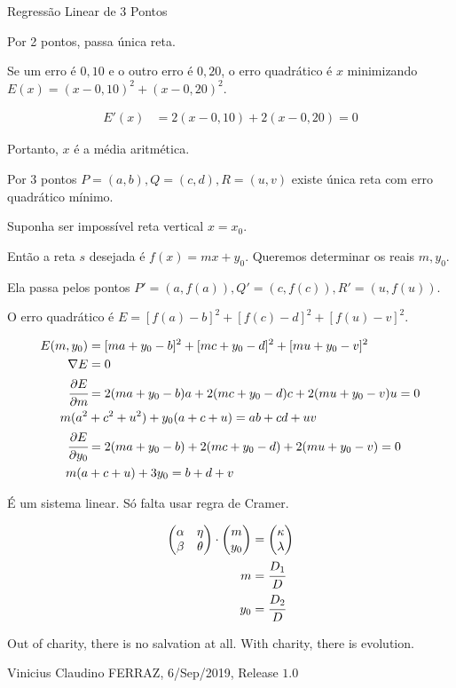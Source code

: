 \documentclass[12pt]{article}
\begin{document}
\Large

\begin{center}
Regress\~ao Linear de 3 Pontos
\end{center}

\normalsize

Por 2 pontos, passa \'unica reta.

Se um erro \'e $0,10$ e o outro erro \'e $0,20$, o erro quadr\'atico \'e $x$ minimizando $E(x) = (x - 0,10)^2 + (x - 0,20)^2$.

\begin{align}
  E'(x) &= 2(x - 0,10) + 2(x - 0,20) = 0
\end{align}

Portanto, $x$ \'e a m\'edia aritm\'etica.

\vspace{3mm}

Por 3 pontos $P = (a, b), Q = (c, d), R = (u, v)$ existe \'unica reta com erro quadr\'atico m\'inimo.

Suponha ser imposs\'ivel reta vertical $x = x_0$.

Ent\~ao a reta $s$ desejada \'e $f(x) = mx + y_0$. Queremos determinar os reais $m, y_0$.

Ela passa pelos pontos $P' = (a, f(a)), Q' = (c, f(c)), R' = (u, f(u))$.

O erro quadr\'atico \'e $E = [f(a) - b]^2 + [f(c) - d]^2 + [f(u) - v]^2$.

\begin{align}
  E(m, y_0) &= [ma + y_0 - b]^2 + [mc + y_0 - d]^2 + [mu + y_0 - v]^2 \\
  \nabla E &= 0 \\
  \cfrac{\partial E}{\partial m} &= 2 (ma + y_0 - b) a + 2 (mc + y_0 - d) c + 2 (mu + y_0 - v) u = 0 \\
  m(a^2 &+ c^2 + u^2) + y_0(a + c + u) = ab + cd + uv \\
  \cfrac{\partial E}{\partial y_0} &= 2 (ma + y_0 - b) + 2 (mc + y_0 - d) + 2 (mu + y_0 - v) = 0 \\
  m(a &+ c + u) + 3y_0 = b + d + v
\end{align}

\'E um sistema linear. S\'o falta usar regra de Cramer.

\begin{align}
  \begin{pmatrix} \alpha & \eta \\ \beta & \theta \end{pmatrix} \cdot \begin{pmatrix} m \\ y_0 \end{pmatrix} &= \begin{pmatrix} \kappa \\ \lambda \end{pmatrix} \\
  m &= \cfrac{D_1}{D} \\
  y_0 &= \cfrac{D_2}{D}
\end{align}

\vspace{3mm}

Out of charity, there is no salvation at all. With charity, there is evolution.

\vspace{3mm}

Vinicius Claudino FERRAZ, 6/Sep/2019, Release $1.0$
\end{document}
